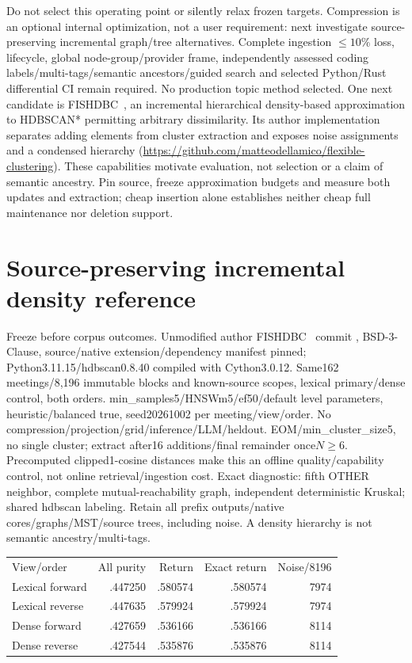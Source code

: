 \documentclass[11pt]{article}
\begin{document}
Do not select this operating point or silently relax frozen targets. Compression
is an optional internal optimization, not a user requirement: next investigate
source-preserving incremental graph/tree alternatives. Complete ingestion
$\le10\%$ loss, lifecycle, global node-group/provider frame, independently assessed
coding labels/multi-tags/semantic ancestors/guided search and selected Python/Rust
differential CI remain required. No production topic method selected.
One next candidate is FISHDBC~\cite{dellamico2019fishdbc}, an incremental
hierarchical density-based approximation to HDBSCAN* permitting arbitrary
dissimilarity. Its author implementation separates adding elements from cluster
extraction and exposes noise assignments and a condensed hierarchy
(\url{https://github.com/matteodellamico/flexible-clustering}). These capabilities
motivate evaluation, not selection or a claim of semantic ancestry. Pin source,
freeze approximation budgets and measure both updates and extraction; cheap
insertion alone establishes neither cheap full maintenance nor deletion support.

\section{Source-preserving incremental density reference}
Freeze  before corpus outcomes.
Unmodified author FISHDBC~\cite{dellamico2019fishdbc} commit
, BSD-3-Clause, source/native
extension/dependency manifest pinned; Python3.11.15/hdbscan0.8.40 compiled with
Cython3.0.12. Same162 meetings/8,196 immutable blocks and known-source scopes,
lexical primary/dense control, both orders. min\_samples5/HNSWm5/ef50/default
level parameters, heuristic/balanced true, seed20261002 per meeting/view/order.
No compression/projection/grid/inference/LLM/heldout. EOM/min\_cluster\_size5,
no single cluster; extract after16 additions/final remainder once$N\ge6$.
Precomputed clipped1-cosine distances make this an offline quality/capability
control, not online retrieval/ingestion cost. Exact diagnostic: fifth OTHER
neighbor, complete mutual-reachability graph, independent deterministic Kruskal;
shared hdbscan labeling. Retain all prefix outputs/native cores/graphs/MST/source
trees, including noise. A density hierarchy is not semantic ancestry/multi-tags.

\begin{center}\begin{tabular}{lrrrr}
View/order & All purity & Return & Exact return & Noise/8196 \\
Lexical forward & .447250 & .580574 & .580574 & 7974 \\
Lexical reverse & .447635 & .579924 & .579924 & 7974 \\
Dense forward & .427659 & .536166 & .536166 & 8114 \\
Dense reverse & .427544 & .535876 & .535876 & 8114
\end{tabular}\end{center}
\end{document}
